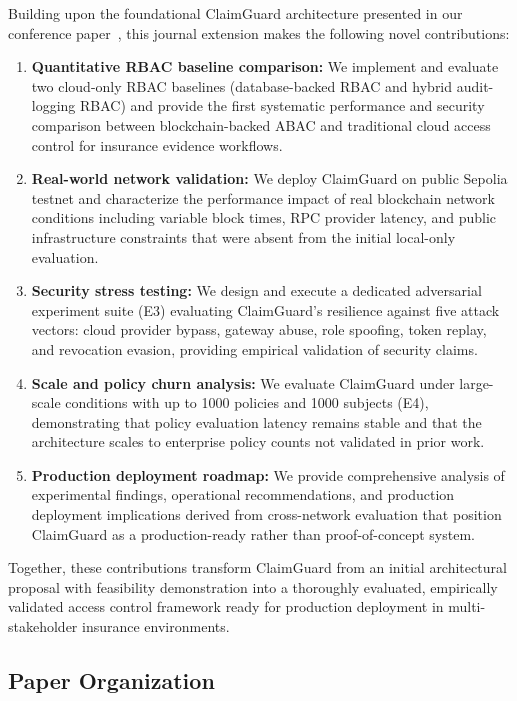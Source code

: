 \documentclass[final,5p,times,twocolumn]{elsarticle}
\begin{document}
Building upon the foundational ClaimGuard architecture presented in our conference paper~\cite{eneh2025claimguard}, this journal extension makes the following novel contributions:
\begin{enumerate}
	\item \textbf{Quantitative RBAC baseline comparison:} We implement and evaluate two cloud-only RBAC baselines (database-backed RBAC and hybrid audit-logging RBAC) and provide the first systematic performance and security comparison between blockchain-backed ABAC and traditional cloud access control for insurance evidence workflows.

	\item \textbf{Real-world network validation:} We deploy ClaimGuard on public Sepolia testnet and characterize the performance impact of real blockchain network conditions including variable block times, RPC provider latency, and public infrastructure constraints that were absent from the initial local-only evaluation.

	\item \textbf{Security stress testing:} We design and execute a dedicated adversarial experiment suite (E3) evaluating ClaimGuard's resilience against five attack vectors: cloud provider bypass, gateway abuse, role spoofing, token replay, and revocation evasion, providing empirical validation of security claims.

	\item \textbf{Scale and policy churn analysis:} We evaluate ClaimGuard under large-scale conditions with up to 1000 policies and 1000 subjects (E4), demonstrating that policy evaluation latency remains stable and that the architecture scales to enterprise policy counts not validated in prior work.

	\item \textbf{Production deployment roadmap:} We provide comprehensive analysis of experimental findings, operational recommendations, and production deployment implications derived from cross-network evaluation that position ClaimGuard as a production-ready rather than proof-of-concept system.
\end{enumerate}

Together, these contributions transform ClaimGuard from an initial architectural proposal with feasibility demonstration into a thoroughly evaluated, empirically validated access control framework ready for production deployment in multi-stakeholder insurance environments.

\subsection{Paper Organization}
\end{document}
